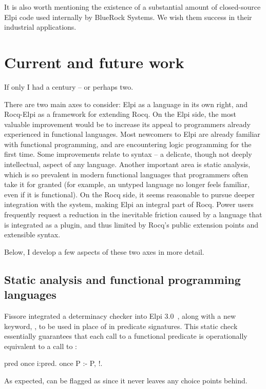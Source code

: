 \documentclass[a4paper, 11pt]{book}
\begin{document}
It is also worth mentioning the existence of a substantial amount of closed-source Elpi code used internally by BlueRock Systems. We wish them success in their industrial applications.

\section{Current and future work}

If only I had a century -- or perhaps two. 

There are two main axes to consider:
Elpi as a language in its own right, and Rocq-Elpi as a framework for extending
Rocq. On the Elpi side, the most valuable improvement would be to increase its
appeal to programmers already experienced in functional languages. Most
newcomers to Elpi are already familiar with functional programming, and are
encountering logic programming for the first time. Some improvements relate to
syntax -- a delicate, though not deeply intellectual, aspect of any language.
Another important area is static analysis, which is so prevalent in modern
functional languages that programmers often take it for granted (for example,
an untyped language no longer feels familiar, even if it is functional). On the
Rocq side, it seems reasonable to pursue deeper integration with the system,
making Elpi an integral part of Rocq. Power users frequently request a
reduction in the inevitable friction caused by a language that is integrated as
a plugin, and thus limited by Rocq’s public extension points and extensible
syntax.

Below, I develop a few aspects of these two axes in more detail.

\subsection{Static analysis and functional programming languages} 

Fissore
integrated a determinacy checker into Elpi 3.0~\cite{elpidet}, along with a new
keyword, , to be used in place of  in predicate
signatures. This static check essentially guarantees that each call to a
functional predicate  is operationally equivalent to a call to
:

\begin{elpicode}
pred once i:pred.
once P :- P, !.
\end{elpicode}

\noindent As expected,  can be flagged as  since it never
leaves any choice points behind.
\end{document}

